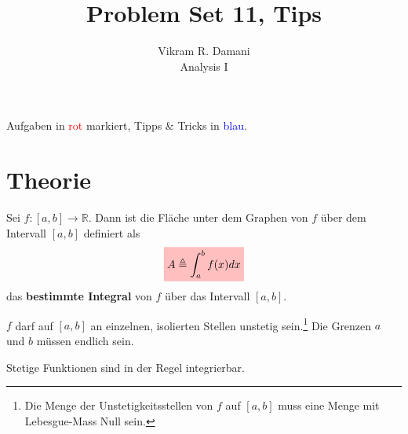 \documentclass[12pt]{article}
\newcommand{\R}{\mathbb{R}} %
\newenvironment{definition}[2][Definition]{\begin{trivlist}
        \item[\hskip \labelsep {\bfseries #1}\hskip \labelsep {\bfseries #2.}]}{\flushright{$\square$}\end{trivlist}}
\newenvironment{remark}[2][Bemerkung]{\begin{trivlist}
        \item[\hskip \labelsep {\bfseries #1}\hskip \labelsep {\bfseries #2.}]}{\end{trivlist}}
\begin{document}
\title{Problem Set 11, Tips}
\author{Vikram R. Damani\\
    Analysis I}

\maketitle
Aufgaben in \textcolor{red}{rot} markiert, Tipps \& Tricks in \textcolor{blue}{blau}.

\section{Theorie}

\begin{definition}{[Bestimmtes Integral]}
    Sei $f: [a,b] \to \R$. Dann ist die Fläche unter dem Graphen von $f$ über dem Intervall $[a,b]$ definiert als
    \begin{align}
        \colorbox{pink}{\mathstrut$A\triangleq\displaystyle\int_{a}^{b}f(x)dx$}
    \end{align}
    das \textbf{bestimmte Integral} von $f$ über das Intervall $[a,b]$.

    \begin{remark}{[Bedingungen für Konvergenz]}
        $f$ darf auf $[a,b]$ an einzelnen, isolierten Stellen unstetig sein.\footnote{Die Menge der Unstetigkeitsstellen von $f$ auf $[a,b]$ muss eine Menge mit Lebesgue-Mass Null sein.} Die Grenzen $a$ und $b$ müssen endlich sein.

        Stetige Funktionen sind in der Regel integrierbar.
    \end{remark}
\end{definition}
\end{document}
